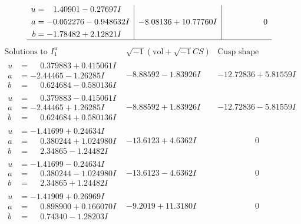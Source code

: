 \documentclass[1p]{elsarticle_modified}
\theoremstyle{definition}
\newcommand{\I}{\sqrt{-1}}
\begin{document}
$$\begin{array}{c|c|c}
\begin{aligned}
u &= \phantom{-}1.40901 - 0.27697 I \\
a &= -0.052276 - 0.948632 I \\
b &= -1.78482 + 2.12821 I\end{aligned}
 & -8.08136 + 10.77760 I & \phantom{-0.000000 } 0\\
 \hline 
 \end{array}$$\newpage$$\begin{array}{c|c|c}  
\text{Solutions to }I^u_{1}& \I (\text{vol} + \sqrt{-1}CS) & \text{Cusp shape}\\
 \hline 
\begin{aligned}
u &= \phantom{-}0.379883 + 0.415061 I \\
a &= -2.44465 - 1.26285 I \\
b &= \phantom{-}0.624684 - 0.580136 I\end{aligned}
 & -8.88592 - 1.83926 I & -12.72836 + 5.81559 I \\ \hline\begin{aligned}
u &= \phantom{-}0.379883 - 0.415061 I \\
a &= -2.44465 + 1.26285 I \\
b &= \phantom{-}0.624684 + 0.580136 I\end{aligned}
 & -8.88592 + 1.83926 I & -12.72836 - 5.81559 I \\ \hline\begin{aligned}
u &= -1.41699 + 0.24634 I \\
a &= \phantom{-}0.380244 + 1.024980 I \\
b &= \phantom{-}2.34865 - 1.24482 I\end{aligned}
 & -13.6123 + 4.6362 I & \phantom{-0.000000 } 0 \\ \hline\begin{aligned}
u &= -1.41699 - 0.24634 I \\
a &= \phantom{-}0.380244 - 1.024980 I \\
b &= \phantom{-}2.34865 + 1.24482 I\end{aligned}
 & -13.6123 - 4.6362 I & \phantom{-0.000000 } 0 \\ \hline\begin{aligned}
u &= -1.41909 + 0.26969 I \\
a &= \phantom{-}0.898900 + 0.166070 I \\
b &= \phantom{-}0.74340 - 1.28203 I\end{aligned}
 & -9.2019 + 11.3180 I & \phantom{-0.000000 } 0 \\ \hline\begin{aligned}

\end{aligned}
\end{array}$$
\end{document}
